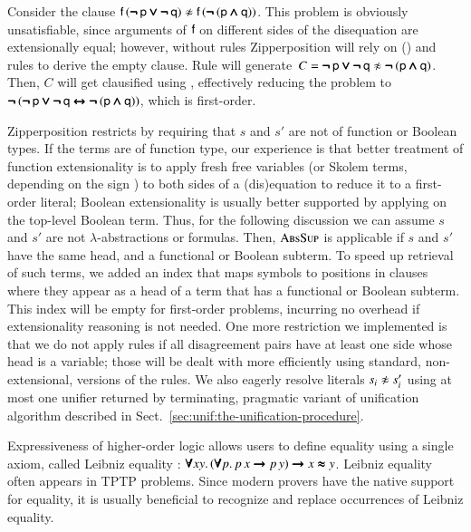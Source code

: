 Consider the clause $\cst{f} \, (\inot\cst{p} \ior \inot\cst{q}) \noteq \cst{f} \,
(\inot (\cst{p} \iand \cst{q}))$. This problem is obviously unsatisfiable, since
arguments of $\mathsf{f}$ on different sides of the disequation are extensionally
equal; however, without  rules Zipperposition will rely on
() and  rules to derive the empty
clause. Rule  will generate~$C = \inot\cst{p} \ior \inot\cst{q} \noteq
\inot (\cst{p} \iand \cst{q})$. Then, $C$ will get clausified using
, effectively reducing the problem to $\pmb{\neg\,} (\pmb{\neg\,}\mathsf{p} \pmb{\lor}
\pmb{\neg\,}\mathsf{q} \pmb{\leftrightarrow} \pmb{\neg\,} (\mathsf{p} \pmb{\land} \mathsf{q}))$, which is first-order.

Zipperposition restricts  by
requiring that $s$ and $s'$ are not of function or Boolean types. If the terms are of function type, our experience is
that better treatment of function extensionality is to apply fresh free
variables (or Skolem terms, depending on the sign
\cite{bbtvw-21-sup-lam}) to both sides of a (dis)equation to reduce it to
a first-order literal; Boolean extensionality is usually better supported by
applying  on the top-level Boolean term. Thus, for the following
discussion we can assume $s$ and $s'$ are not $\lambda$-abstractions or formulas. Then, $\textsc{AbsSup}$ is applicable if $s$
and $s'$ have the same head, and a functional or Boolean subterm. To speed up
retrieval of such terms, we added an index that maps symbols to positions in
clauses where they appear as a head of a term that has a functional or Boolean
subterm. This index will be empty for first-order problems, incurring no
overhead if extensionality reasoning is not needed. One more restriction we implemented is that we do not apply  rules if all
disagreement pairs have at least one side whose head is a variable; those will
be dealt with more efficiently using standard, non-extensional, versions of the
rules. We also eagerly resolve literals $s_i \not\approx s'_i$ using at most one
unifier returned by terminating, pragmatic variant of unification algorithm described in 
Sect.~\ref{sec:unif:the-unification-procedure}.

Expressiveness of higher-order logic allows users to define equality using a single axiom,
called Leibniz equality \cite{pa-01-classical-ty-thy}:
%
$ \pmb{\forall} xy. \,
   (\pmb{\forall} p. \, p \, x \pmb{\rightarrow} p \, y) \pmb{\rightarrow} x \pmb{\approx} y$.
%
Leibniz equality often appears in TPTP problems. Since modern provers have the native support
for equality, it is usually beneficial to recognize and replace occurrences of Leibniz equality.

